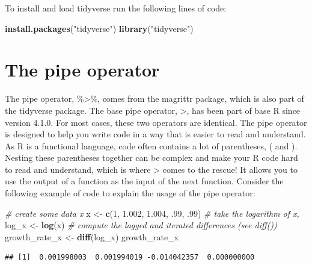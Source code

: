 \documentclass[
  12pt,
  oneside]{book}
\newenvironment{Shaded}{\begin{snugshade}}{\end{snugshade}}
\newcommand{\CommentTok}[1]{\textcolor[rgb]{0.56,0.35,0.01}{\textit{#1}}}
\newcommand{\DecValTok}[1]{\textcolor[rgb]{0.00,0.00,0.81}{#1}}
\newcommand{\FloatTok}[1]{\textcolor[rgb]{0.00,0.00,0.81}{#1}}
\newcommand{\FunctionTok}[1]{\textcolor[rgb]{0.13,0.29,0.53}{\textbf{#1}}}
\newcommand{\NormalTok}[1]{#1}
\newcommand{\OtherTok}[1]{\textcolor[rgb]{0.56,0.35,0.01}{#1}}
\newcommand{\StringTok}[1]{\textcolor[rgb]{0.31,0.60,0.02}{#1}}
\theoremstyle{definition}
\theoremstyle{definition}
\theoremstyle{definition}
\theoremstyle{definition}
\theoremstyle{remark}
\begin{document}
To install and load tidyverse run the following lines of code:

\begin{Shaded}
\begin{Highlighting}[]
\FunctionTok{install.packages}\NormalTok{(}\StringTok{"tidyverse"}\NormalTok{)}
\FunctionTok{library}\NormalTok{(}\StringTok{"tidyverse"}\NormalTok{)}
\end{Highlighting}
\end{Shaded}

\hypertarget{pipeoperator}{%
\section{The pipe operator}\label{pipeoperator}}

The pipe operator, \%\textgreater\%, comes from the magrittr package, which is also part of the tidyverse package. The base pipe operator, \textbar\textgreater, has been part of base R since version 4.1.0. For most cases, these two operators are identical. The pipe operator is designed to help you write code in a way that is easier to read and understand. As R is a functional language, code often contains a lot of parentheses, ( and ). Nesting these parentheses together can be complex and make your R code hard to read and understand, which is where \textbar\textgreater{} comes to the rescue! It allows you to use the output of a function as the input of the next function. Consider the following example of code to explain the usage of the pipe operator:

\begin{Shaded}
\begin{Highlighting}[]
\CommentTok{\# create some data \textasciigrave{}x\textasciigrave{}}
\NormalTok{x }\OtherTok{\textless{}{-}} \FunctionTok{c}\NormalTok{(}\DecValTok{1}\NormalTok{, }\FloatTok{1.002}\NormalTok{, }\FloatTok{1.004}\NormalTok{, .}\DecValTok{99}\NormalTok{, .}\DecValTok{99}\NormalTok{)}
\CommentTok{\# take the logarithm of \textasciigrave{}x\textasciigrave{}, }
\NormalTok{log\_x }\OtherTok{\textless{}{-}} \FunctionTok{log}\NormalTok{(x)}
\CommentTok{\# compute the lagged and iterated differences (see \textasciigrave{}diff()\textasciigrave{})}
\NormalTok{growth\_rate\_x }\OtherTok{\textless{}{-}} \FunctionTok{diff}\NormalTok{(log\_x)}
\NormalTok{growth\_rate\_x}
\end{Highlighting}
\end{Shaded}

\begin{verbatim}
## [1]  0.001998003  0.001994019 -0.014042357  0.000000000
\end{verbatim}
\end{document}
